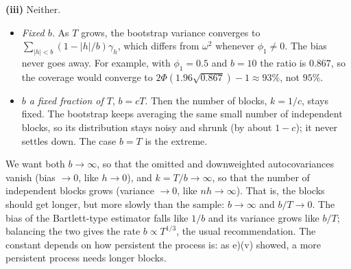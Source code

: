 \documentclass[11pt]{article}
\begin{document}
\textbf{(iii)} Neither.
\begin{itemize}
	\item \emph{Fixed $b$.} As $T$ grows, the bootstrap variance converges to $\sum_{|h|<b}(1-|h|/b)\gamma_h$, which differs from $\omega^2$ whenever $\phi_1\neq0$. The bias never goes away. For example, with $\phi_1=0.5$ and $b=10$ the ratio is $0.867$, so the coverage would converge to $2\Phi(1.96\sqrt{0.867})-1\approx93\%$, not $95\%$.
	\item \emph{$b$ a fixed fraction of $T$}, $b=cT$. Then the number of blocks, $k=1/c$, stays fixed. The bootstrap keeps averaging the same small number of independent blocks, so its distribution stays noisy and shrunk (by about $1-c$); it never settles down. The case $b=T$ is the extreme.
\end{itemize}
We want both $b\to\infty$, so that the omitted and downweighted autocovariances vanish (bias $\to0$, like $h\to0$), and $k=T/b\to\infty$, so that the number of independent blocks grows (variance $\to0$, like $nh\to\infty$). That is, the blocks should get longer, but more slowly than the sample: $b\to\infty$ and $b/T\to0$. The bias of the Bartlett-type estimator falls like $1/b$ and its variance grows like $b/T$; balancing the two gives the rate $b\propto T^{1/3}$, the usual recommendation. The constant depends on how persistent the process is: as e)(v) showed, a more persistent process needs longer blocks.


\end{document}
